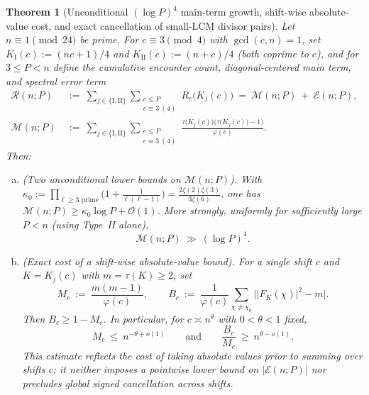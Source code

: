 \documentclass[11pt, a4paper]{article}
\theoremstyle{plain}
\newtheorem{theorem}{Theorem}[section]
\theoremstyle{definition}
\newcommand{\I}{\mathrm{I}}
\newcommand{\II}{\mathrm{II}}
\begin{document}
\begin{theorem}[Unconditional $(\log P)^{4}$ main-term growth, shift-wise absolute-value cost, and exact cancellation of small-LCM divisor pairs]\label{thm:centered_main_term_and_short_lcm}\label{aud:log4}\label{aud:absolute}\label{aud:shortlcm}
Let $n\equiv1\pmod{24}$ be prime. For $c\equiv3\pmod 4$ with $\gcd(c,n)=1$, set $K_{\I}(c):=(nc+1)/4$ and $K_{\II}(c):=(n+c)/4$ (both coprime to $c$), and for $3\le P<n$ define the cumulative encounter count, diagonal-centered main term, and spectral error term
\begin{equation}\label{aud:ME}
\begin{split}
\mathcal{R}(n;P)\ &:=\ \sum_{j\in\{\I,\II\}}\sum_{\substack{c\le P\\ c\equiv3\ (4)}}R_c\big(K_j(c)\big)\ =\ \mathcal{M}(n;P)\ +\ \mathcal{E}(n;P),\\
\mathcal{M}(n;P)\ &:=\ \sum_{j\in\{\I,\II\}}\sum_{\substack{c\le P\\ c\equiv3\ (4)}}\frac{\tau\big(K_j(c)\big)\big(\tau\big(K_j(c)\big)-1\big)}{\varphi(c)}.
\end{split}
\end{equation}
Then:
\begin{enumerate}[(a)]
    \item \emph{(Two unconditional lower bounds on $\mathcal{M}(n;P)$).} With $\kappa_0:=\prod_{\ell\ge3\text{ prime}}\big(1+\frac{1}{\ell(\ell-1)}\big)=\frac{2\zeta(2)\zeta(3)}{3\zeta(6)}$, one has $\mathcal{M}(n;P)\ge\kappa_0\log P+\mathcal{O}(1)$. More strongly, uniformly for sufficiently large $P<n$ (using Type~II alone),
    \begin{equation}\label{aud:log4eq}
    \mathcal{M}(n;P)\ \gg\ (\log P)^{4}.
    \end{equation}
    \item \emph{(Exact cost of a shift-wise absolute-value bound).} For a single shift $c$ and $K=K_j(c)$ with $m=\tau(K)\ge 2$, set
    \[
    M_c\ :=\ \frac{m(m-1)}{\varphi(c)},\qquad B_c\ :=\ \frac{1}{\varphi(c)}\sum_{\chi\ne\chi_0}\Big|\big|F_K(\chi)\big|^{2}-m\Big|.
    \]
    Then $B_c\ge 1-M_c$. In particular, for $c\asymp n^{\theta}$ with $0<\theta<1$ fixed,
    \begin{equation}\label{eq:shiftwise_abs_cost}
    M_c\ \le\ n^{-\theta+o(1)}\qquad\text{and}\qquad \frac{B_c}{M_c}\ \ge\ n^{\theta-o(1)}.
    \end{equation}
    This estimate reflects the cost of taking absolute values \emph{prior} to summing over shifts $c$; it neither imposes a pointwise lower bound on $|\mathcal{E}(n;P)|$ nor precludes global signed cancellation across shifts.

\end{enumerate}
\end{theorem}
\end{document}
